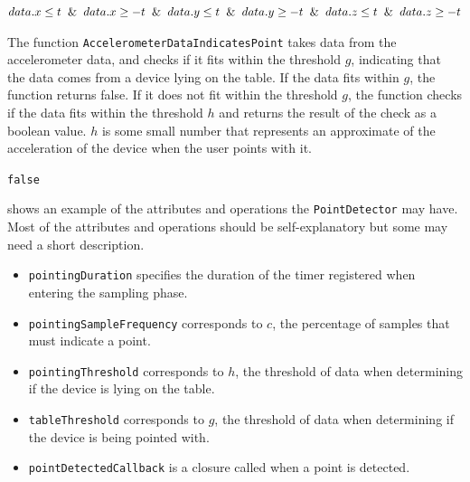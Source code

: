 \begin{algorithm}
  \begin{algorithmic}
      \State \Return $data.x \leq t \And data.x \geq -t \And data.y \leq t \And data.y \geq -t \And data.z \leq t \And data.z \geq -t$
    \EndFunction
  \end{algorithmic}
\end{algorithm}

The function \texttt{AccelerometerDataIndicatesPoint} takes data from the accelerometer data, 
and checks if it fits within the threshold $g$, 
indicating that the data comes from a device lying on the table. 
If the data fits within $g$, 
the function returns false. 
If it does not fit within the threshold $g$, the function checks if the data fits within the threshold $h$ and returns the result of the check as a boolean value. $h$ is some small number that represents an approximate of the acceleration of the device when the user points with it.

\begin{algorithm}
  \begin{algorithmic}
    \State \Return \texttt{false}
    \Else
    \State \Return {}
    \EndIf
    \EndFunction
  \end{algorithmic}
\end{algorithm}

 shows an example of the attributes and operations the \texttt{PointDetector} may have. 
Most of the attributes and operations should be self-explanatory but some may need a short description.

\begin{itemize}
  \item \texttt{pointingDuration} specifies the duration of the timer registered when entering the sampling phase.
  \item \texttt{pointingSampleFrequency} corresponds to $c$, the percentage of samples that must indicate a point.
  \item \texttt{pointingThreshold} corresponds to $h$, the threshold of data when determining if the device is lying on the table.
  \item \texttt{tableThreshold} corresponds to $g$, the threshold of data when determining if the device is being pointed with.
  \item \texttt{pointDetectedCallback} is a closure called when a point is detected.
\end{itemize}

